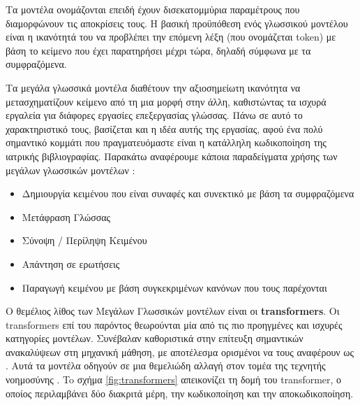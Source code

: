 \documentclass[12pt]{extarticle}
\begin{document}
Tα μοντέλα ονομάζονται  επειδή έχουν δισεκατομμύρια παραμέτρους που διαμορφώνουν τις αποκρίσεις τους. Η βασική προϋπόθεση ενός γλωσσικού μοντέλου είναι η ικανότητά του να προβλέπει την επόμενη λέξη (που ονομάζεται token) με βάση το κείμενο που έχει παρατηρήσει μέχρι τώρα, δηλαδή σύμφωνα με τα συμφραζόμενα.


Τα μεγάλα γλωσσικά μοντέλα διαθέτουν την αξιοσημείωτη ικανότητα να μετασχηματίζουν κείμενο από τη μια μορφή στην άλλη, καθιστώντας τα ισχυρά εργαλεία για διάφορες εργασίες επεξεργασίας γλώσσας. 
Πάνω σε αυτό το χαρακτηριστικό τους, βασίζεται και η ιδέα αυτής της εργασίας, αφού ένα πολύ σημαντικό κομμάτι που πραγματευόμαστε είναι η κατάλληλη κωδικοποίηση της ιατρικής βιβλιογραφίας.
Παρακάτω αναφέρουμε κάποια παραδείγματα χρήσης των μεγάλων γλωσσικών μοντέλων \cite{Paranjape2023}: 

\begin{itemize}
    \item Δημιουργία κειμένου που είναι συναφές και συνεκτικό με βάση τα συμφραζόμενα
    \item Μετάφραση Γλώσσας
    \item Σύνοψη / Περίληψη Κειμένου
    \item  Απάντηση σε ερωτήσεις
    \item Παραγωγή κειμένου με βάση συγκεκριμένων κανόνων που τους παρέχονται
\end{itemize}

Ο θεμέλιος λίθος των Μεγάλων Γλωσσικών μοντέλων είναι οι \textbf{transformers}.
Οι transformers \cite{Vaswani2017} επί του παρόντος θεωρούνται μία από τις πιο προηγμένες και ισχυρές κατηγορίες μοντέλων. Συνέβαλαν καθοριστικά στην επίτευξη σημαντικών ανακαλύψεων στη μηχανική μάθηση, με αποτέλεσμα ορισμένοι να τους αναφέρουν ως . Aυτά τα μοντέλα οδηγούν σε μια θεμελιώδη αλλαγή στον τομέα της τεχνητής νοημοσύνης \cite{Bommasani2021}.
To σχήμα \ref{fig:transformers} απεικονίζει τη δομή του transformer, ο οποίος περιλαμβάνει δύο διακριτά μέρη, την κωδικοποίηση και την αποκωδικοποίηση.
\end{document}

